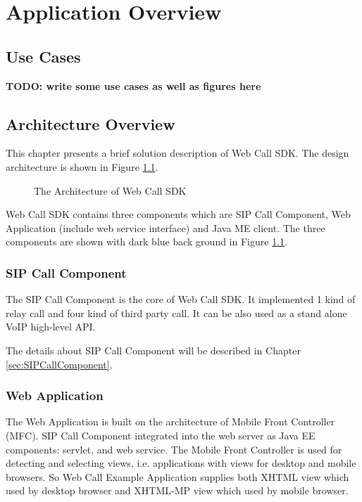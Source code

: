 
\chapter{Application Overview}
\label{sec:WebCallSDKArchitecture}

\section{Use Cases}

\textbf{TODO: write some use cases as well as figures here}


\section{Architecture Overview}
\label{sec:WebCallSDKArchitecture:ArchitectureOverview}

This chapter presents a brief solution description of Web Call SDK. The design architecture is shown in Figure \ref{fig:ArchitectureOfWebCallSDK}.

\begin{figure}[!hbtp]
\centering
{}
\caption{The Architecture of Web Call SDK}
\label{fig:ArchitectureOfWebCallSDK}
\end{figure}

Web Call SDK contains three components which are SIP Call Component, Web Application (include web service interface) and Java ME client. The three components are shown with dark blue back ground in Figure \ref{fig:ArchitectureOfWebCallSDK}.

\subsection{SIP Call Component}

The SIP Call Component is the core of Web Call SDK. It implemented 1 kind of relay call and four kind of third party call. It can be also used as a stand alone VoIP high-level API. 

The details about SIP Call Component will be described in Chapter \ref{sec:SIPCallComponent}.

\subsection{Web Application}

The Web Application is built on the architecture of Mobile Front Controller (MFC). SIP Call Component integrated into the web server as Java EE components: servlet, and web service. The Mobile Front Controller is used for detecting and selecting views, i.e. applications with views for desktop and mobile browsers. So Web Call Example Application supplies both XHTML view which used by desktop browser and XHTML-MP view which used by mobile browser. 

